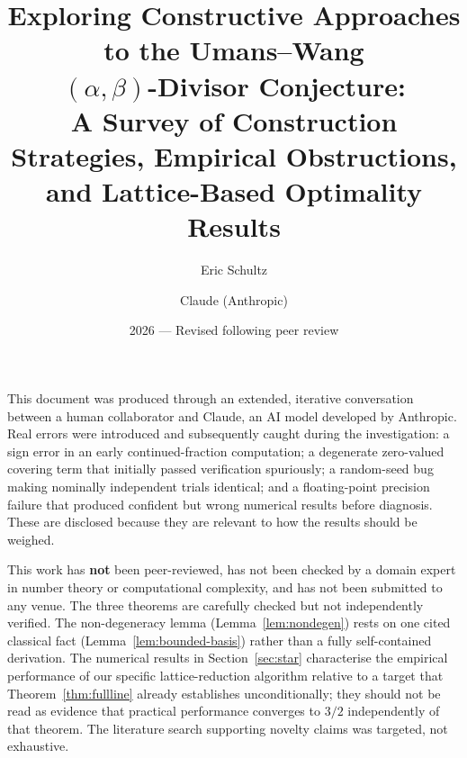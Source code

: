 \documentclass[12pt]{article}
\title{%
  Exploring Constructive Approaches to the Umans--Wang\\
  $(\alpha,\beta)$-Divisor Conjecture:\\[4pt]
  \large A Survey of Construction Strategies, Empirical Obstructions,\\
  and Lattice-Based Optimality Results%
}
\author{Eric Schultz \and Claude (Anthropic)}
\date{2026 --- Revised following peer review}
\theoremstyle{remark}
\begin{document}
\maketitle
\thispagestyle{empty}

\begin{provenancebox}
This document was produced through an extended, iterative conversation between a
human collaborator and Claude, an AI model developed by Anthropic.  Real errors
were introduced and subsequently caught during the investigation: a sign error in
an early continued-fraction computation; a degenerate zero-valued covering term
that initially passed verification spuriously; a random-seed bug making nominally
independent trials identical; and a floating-point precision failure that
produced confident but wrong numerical results before diagnosis.  These are
disclosed because they are relevant to how the results should be weighed.

This work has \textbf{not} been peer-reviewed, has not been checked by a domain
expert in number theory or computational complexity, and has not been submitted to
any venue.  The three theorems are carefully checked but not independently
verified.  The non-degeneracy lemma (Lemma~\ref{lem:nondegen}) rests on one
cited classical fact (Lemma~\ref{lem:bounded-basis}) rather than a fully
self-contained derivation.  The numerical results in Section~\ref{sec:star}
characterise the empirical performance of our specific lattice-reduction
algorithm relative to a target that Theorem~\ref{thm:fullline} already
establishes unconditionally; they should not be read as evidence that practical
performance converges to $3/2$ independently of that theorem.  The literature
search supporting novelty claims was targeted, not exhaustive.
\end{provenancebox}
\end{document}
